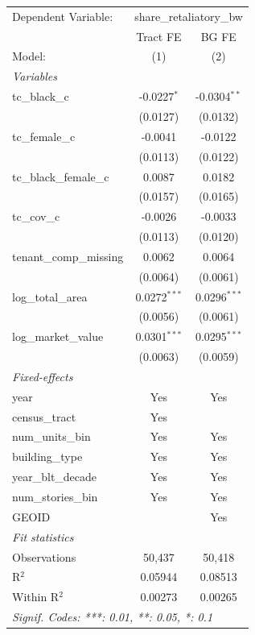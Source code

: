 \par\endgroup
\begingroup
\centering
\begin{tabular}{lcc}
   \tabularnewline \midrule \midrule
   Dependent Variable: & \multicolumn{2}{c}{share\_retaliatory\_bw}\\
                           & Tract FE       & BG FE \\   
   Model:                  & (1)            & (2)\\  
   \midrule
   \emph{Variables}\\
   tc\_black\_c            & -0.0227$^{*}$  & -0.0304$^{**}$\\   
                           & (0.0127)       & (0.0132)\\   
   tc\_female\_c           & -0.0041        & -0.0122\\   
                           & (0.0113)       & (0.0122)\\   
   tc\_black\_female\_c    & 0.0087         & 0.0182\\   
                           & (0.0157)       & (0.0165)\\   
   tc\_cov\_c              & -0.0026        & -0.0033\\   
                           & (0.0113)       & (0.0120)\\   
   tenant\_comp\_missing   & 0.0062         & 0.0064\\   
                           & (0.0064)       & (0.0061)\\   
   log\_total\_area        & 0.0272$^{***}$ & 0.0296$^{***}$\\   
                           & (0.0056)       & (0.0061)\\   
   log\_market\_value      & 0.0301$^{***}$ & 0.0295$^{***}$\\   
                           & (0.0063)       & (0.0059)\\   
   \midrule
   \emph{Fixed-effects}\\
   year                    & Yes            & Yes\\  
   census\_tract           & Yes            & \\  
   num\_units\_bin         & Yes            & Yes\\  
   building\_type          & Yes            & Yes\\  
   year\_blt\_decade       & Yes            & Yes\\  
   num\_stories\_bin       & Yes            & Yes\\  
   GEOID                   &                & Yes\\  
   \midrule
   \emph{Fit statistics}\\
   Observations            & 50,437         & 50,418\\  
   R$^2$                   & 0.05944        & 0.08513\\  
   Within R$^2$            & 0.00273        & 0.00265\\  
   \midrule \midrule
   \multicolumn{3}{l}{\emph{Signif. Codes: ***: 0.01, **: 0.05, *: 0.1}}\\
\end{tabular}
